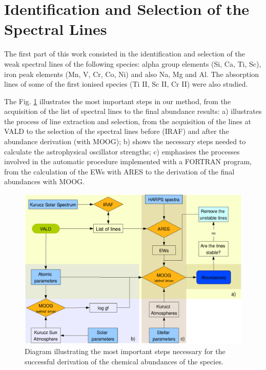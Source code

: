 \documentclass[dvips,12pt,a4paper]{report}
\begin{document}
{\section {Identification and Selection of the Spectral Lines}

The first part of this work consisted in the identification and selection of the weak spectral lines of the following species: alpha group elements (Si, Ca, Ti, Sc), iron peak elements (Mn, V, Cr, Co, Ni) and also Na, Mg and Al. The absorption lines of some of the first ionised species (Ti II, Sc II, Cr II)  were also studied.

The Fig. \ref{esquema} illustrates the most important steps in our method, from the acquisition of the list of spectral lines to the final abundance results: a) illustrates the process of line extraction and selection, from the acquisition of the lines at VALD to the selection of the spectral lines before (IRAF) and after the abundance derivation (with MOOG); b) shows the necessary steps needed to calculate the astrophysical oscillator strengths; c) emphasises the processes involved in the automatic procedure implemented with a FORTRAN program, from the calculation of the EWs with ARES to the derivation of the final abundances with MOOG.

\begin{figure}[h]
\centering
\includegraphics[width= 12 cm]{pics/parte3/esquemav3.eps}
\caption{Diagram illustrating the most important steps necessary for the successful derivation of the chemical abundances of the species.}
\label{esquema}
\end{figure}



}
\end{document}
